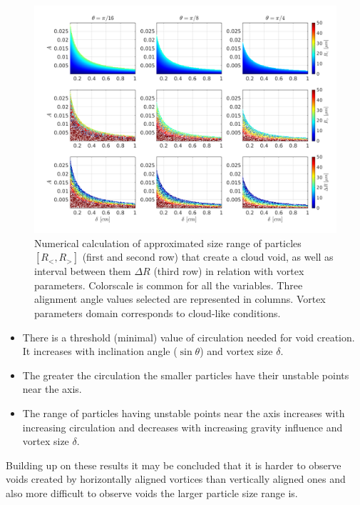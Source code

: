 \documentclass[../main.tex]{subfiles}
\begin{document}
\begin{figure}[h]
\centering
\noindent\includegraphics[width=35pc]{gfx/RlRrDeltaR.png}
\caption{Numerical calculation of approximated size range of particles $[R_<,R_>]$ (first and second row) that create a cloud void, as well as interval between them $\Delta R$ (third row) in relation with vortex parameters. Colorscale is common for all the variables. Three alignment angle values selected are represented in columns. Vortex parameters domain corresponds to cloud-like conditions.}
\label{fig:ch4_6}
\end{figure}


\begin{itemize}
\item There is a threshold (minimal) value of circulation needed for void creation. It increases with inclination angle ($\sin \theta$) and vortex size $\delta$.
\item The greater the circulation the smaller particles  have their unstable points near the axis.
\item The range of particles having unstable points near the axis increases with increasing circulation and decreases with increasing gravity influence and vortex size $\delta$.
\end{itemize}

\noindent Building up on these results it may be concluded that it is harder to observe voids created by horizontally aligned vortices than vertically aligned ones and also more difficult to observe voids the larger particle size range is.\\
\end{document}
